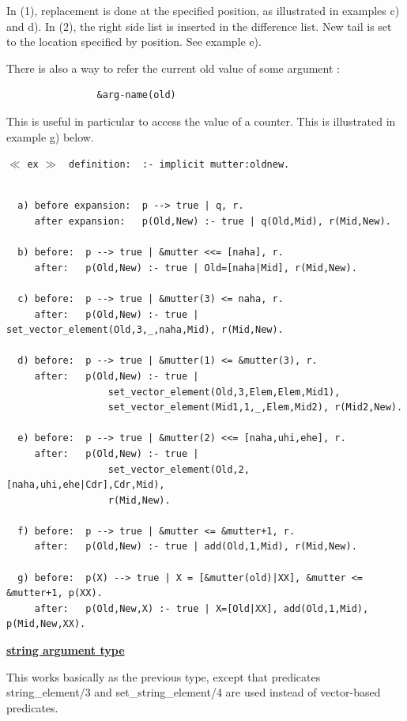In (1), replacement is done at the specified position, as illustrated in
examples c) and d). In (2), the right side list is inserted in the difference
list. New tail is set to the location specified by position. See example e).

There is also a way to refer the current old value of some argument :
\begin{verbatim}
                &arg-name(old)
\end{verbatim}
This is useful in particular to access the value of a counter. This is
illustrated in example g) below.\vspace{1ex}

$\ll$ \verb|ex| $\gg$ \verb| definition:  :- implicit mutter:oldnew.|
\begin{verbatim}

  a) before expansion:  p --> true | q, r.
     after expansion:   p(Old,New) :- true | q(Old,Mid), r(Mid,New).

  b) before:  p --> true | &mutter <<= [naha], r.
     after:   p(Old,New) :- true | Old=[naha|Mid], r(Mid,New).

  c) before:  p --> true | &mutter(3) <= naha, r.
     after:   p(Old,New) :- true | set_vector_element(Old,3,_,naha,Mid), r(Mid,New).

  d) before:  p --> true | &mutter(1) <= &mutter(3), r.
     after:   p(Old,New) :- true |
                  set_vector_element(Old,3,Elem,Elem,Mid1),
                  set_vector_element(Mid1,1,_,Elem,Mid2), r(Mid2,New).

  e) before:  p --> true | &mutter(2) <<= [naha,uhi,ehe], r.
     after:   p(Old,New) :- true |
                  set_vector_element(Old,2,[naha,uhi,ehe|Cdr],Cdr,Mid),
                  r(Mid,New).

  f) before:  p --> true | &mutter <= &mutter+1, r.
     after:   p(Old,New) :- true | add(Old,1,Mid), r(Mid,New).

  g) before:  p(X) --> true | X = [&mutter(old)|XX], &mutter <= &mutter+1, p(XX).
     after:   p(Old,New,X) :- true | X=[Old|XX], add(Old,1,Mid), p(Mid,New,XX).
\end{verbatim}
\vspace{1ex}

\noindent\underline{\bf string argument type}
 \vspace{1ex}\par
This works basically as the previous type, except that
predicates string_element/3 and set_string_element/4 are used instead of
vector-based predicates.
\vspace{2ex}

